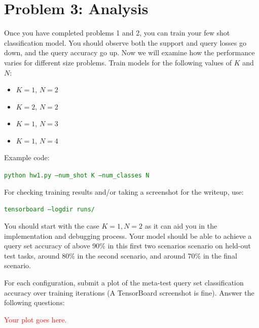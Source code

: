 \documentclass[12pt]{article}
\begin{document}
\section*{Problem 3: Analysis}

Once you have completed problems 1 and 2, you can train your few shot classification model. You should observe both the support and query losses go down, and the query accuracy go up. Now we will examine how the performance varies for different size problems.
Train models for the following values of $K$ and $N$:
\begin{itemize}
    \item $K = 1$, $N=2$ %
    \item $K = 2$, $N=2$ %
    \item $K = 1$, $N=3$ %
    \item $K = 1$, $N=4$ %
\end{itemize}

Example code:

\textcolor{green}{\texttt{python hw1.py --num\_shot K --num\_classes N}}

For checking training results and/or taking a screenshot for the writeup, use:

\textcolor{green}{\texttt{tensorboard --logdir runs/}}

You should start with the case $K=1 , N=2$ as it can aid you in the implementation and debugging process. Your model should be able to achieve a query set accuracy of above 90\% in this first two scenarios scenario on held-out test tasks, around 80\% in the second scenario, and around 70\% in the final scenario.


For each configuration, submit a plot of the meta-test query set classification accuracy over training iterations (A TensorBoard screenshot is fine). Answer the following questions:

\textcolor{red}{Your plot goes here.}
\end{document}
